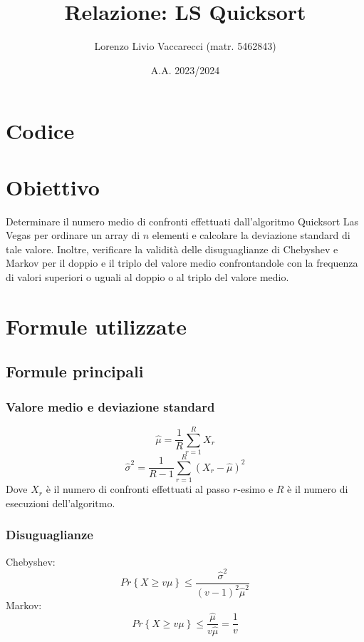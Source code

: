 \documentclass[12pt]{article}
\title{Relazione: LS Quicksort}
\author{Lorenzo Livio Vaccarecci (matr. 5462843)}
\date{A.A. 2023/2024}
\begin{document}
\maketitle
\section{Codice}

\newpage
\section{Obiettivo}
Determinare il numero medio di confronti effettuati 
dall'algoritmo Quicksort Las Vegas per ordinare un array di $n$ 
elementi e calcolare la deviazione standard di tale valore. Inoltre, 
verificare la validità delle disuguaglianze di Chebyshev e Markov per 
il doppio e il triplo del valore medio confrontandole con la frequenza
di valori superiori o uguali al doppio o al triplo del valore medio.
\section{Formule utilizzate}
\subsection{Formule principali}
\subsubsection{Valore medio e deviazione standard}
\begin{equation}
    \hat{\mu} = \frac{1}{R}\sum_{r=1}^{R}X_{r} 
\end{equation}
\begin{equation}
    \hat{\sigma}^{2} = \frac{1}{R-1}\sum_{r=1}^{R}(X_{r}-\hat{\mu})^{2}
\end{equation}
Dove $X_{r}$ è il numero di confronti effettuati al passo $r$-esimo e $R$ 
è il numero di esecuzioni dell'algoritmo.
\subsubsection{Disuguaglianze}
Chebyshev:
\begin{equation}
    Pr\left\{X\geq v\mu\right\}\leq\frac{\hat{\sigma}^{2}}{(v-1)^{2}\hat{\mu}^{2}}
\end{equation}
Markov:
\begin{equation}
    Pr\left\{X\geq v\mu\right\}\leq\frac{\hat{\mu}}{v\hat{\mu}}=\frac{1}{v}
\end{equation}
\end{document}
